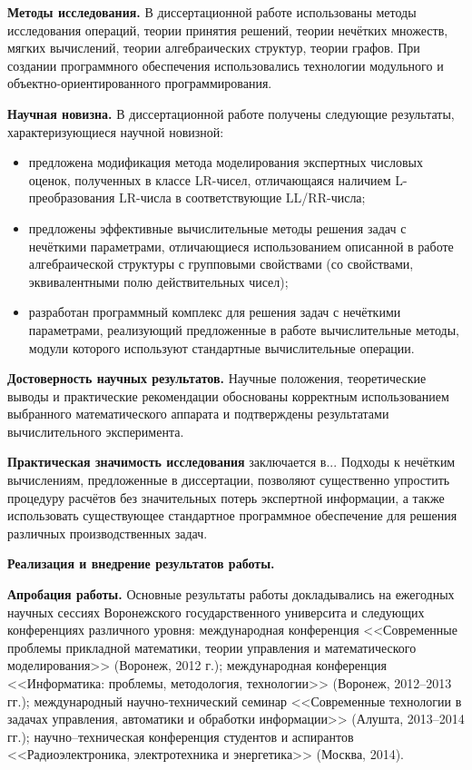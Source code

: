 \textbf{Методы исследования.} В диссертационной работе использованы методы исследования операций, теории принятия решений, теории нечётких множеств, мягких вычислений, теории алгебраических структур, теории графов. При создании программного обеспечения использовались технологии модульного и объектно-ориентированного программирования.

\textbf{Научная новизна.} В диссертационной работе получены следующие результаты, характеризующиеся научной новизной:
\begin{itemize}
  \item предложена модификация метода моделирования экспертных числовых оценок, полученных в классе LR-чисел, отличающаяся наличием L-преобразования LR-числа в соответствующие LL/RR-числа;
  \item предложены эффективные вычислительные методы решения задач с нечёткими параметрами, отличающиеся использованием описанной в работе алгебраической структуры с групповыми свойствами (со свойствами, эквивалентными полю действительных чисел);
  \item разработан программный комплекс для решения задач с нечёткими параметрами, реализующий предложенные в работе вычислительные методы, модули которого используют стандартные вычислительные операции.
\end{itemize}

\textbf{Достоверность научных результатов.} Научные положения, теоретические выводы и практические рекомендации обоснованы корректным использованием выбранного математического аппарата и подтверждены результатами вычислительного эксперимента.

\textbf{Практическая значимость исследования} заключается в... Подходы к нечётким вычислениям, предложенные в диссертации, позволяют существенно упростить процедуру расчётов без значительных потерь экспертной информации, а также использовать существующее стандартное программное обеспечение для решения различных производственных задач.

\textbf{Реализация и внедрение результатов работы.}

\textbf{Апробация работы.} Основные результаты работы докладывались на ежегодных научных сессиях Воронежского государственного университа и следующих конференциях различного уровня: международная конференция <<Современные проблемы прикладной математики, теории управления и математического моделирования>> (Воронеж, 2012 г.); международная конференция <<Информатика: проблемы, методология, технологии>> (Воронеж, 2012--2013 гг.); международный научно-технический семинар <<Современные технологии в задачах управления, автоматики и обработки информации>> (Алушта, 2013--2014 гг.); научно--техническая конференция студентов и аспирантов <<Радиоэлектроника, электротехника и энергетика>> (Москва, 2014).

